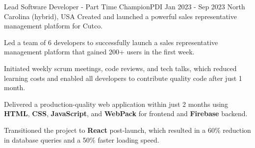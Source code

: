 
\begin{cventries}
  \cventry
    {Lead Software Developer - Part Time} %
    {ChampionPDI} %
    {Jan 2023 - Sep 2023} %
    {North Carolina (hybrid), USA} %
    {Created and launched a powerful sales representative management platform for Cutco.}
    {
      \begin{cvitems} %
        \item {Led a team of 6 developers to successfully launch a sales representative management platform that gained 200+ users in the first week.}
        \item {Initiated weekly scrum meetings, code reviews, and tech talks, which reduced learning costs and enabled all developers to contribute quality code after just 1 month.}
        \item {Delivered a production-quality web application within just 2 months using \textbf{HTML}, \textbf{CSS}, \textbf{JavaScript}, and \textbf{WebPack} for frontend and \textbf{Firebase} backend.}
        \item {Transitioned the project to \textbf{React} post-launch, which resulted in a 60\% reduction in database queries and a 50\% faster loading speed.}
      \end{cvitems}
    }


\end{cventries}
